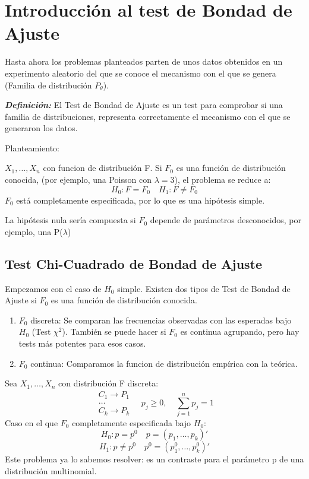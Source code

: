 \section{Introducción al test de Bondad de Ajuste}

Hasta ahora los problemas planteados parten de unos datos obtenidos
en un experimento aleatorio del que se conoce el mecanismo con el que se genera (Familia de distribución $P_\theta$).

\textit{\textbf{Definición: }}El Test de Bondad de Ajuste es un test para comprobar si una familia de distribuciones,
 representa correctamente el mecanismo con el que se generaron los datos.

Planteamiento:

$X_1,\dots,X_n$ con funcion de distribución F. Si $F_0$ es una función de distribución conocida, (por ejemplo, una Poisson con $\lambda=3$), el problema se reduce a:
\[
    H_0: F=F_0 \quad H_1: F \neq F_0
\]
$F_0$ está completamente especificada, por lo que es una hipótesis simple.

La hipótesis nula sería compuesta si $F_0$ depende de parámetros desconocidos, por ejemplo, una P($\lambda$)

\subsection{Test Chi-Cuadrado de Bondad de Ajuste} 

Empezamos con el caso de $H_0$ simple. Existen dos tipos de Test de Bondad de Ajuste si $F_0$ es una función de  distribución conocida.
\begin{enumerate}
    \item $F_0$ discreta: Se comparan las frecuencias observadas con las esperadas bajo $H_0$ (Test $\chi^2$). También se puede hacer si $F_0$ es continua agrupando, pero hay tests más potentes para esos casos.
    \item $F_0$ continua: Comparamos la funcion de distribución empírica con la teórica.
\end{enumerate}

Sea $X_1,\dots,X_n$ con distribución F discreta:
\[
    \begin{matrix}
        C_1 \to P_1\\
        \dots \\
        C_k \to P_k
    \end{matrix}
    \quad
    p_j \geq 0,
    \quad \sum_{j=1}^{n} p_j=1
\]
Caso en el que $F_0$ completamente especificada bajo $H_0$:
\[
    H_0: p=p^0 \quad p=(p_1,\dots,p_k)'
\]
\[
    H_1: p \neq p^0 \quad p^0=(p_1^0,\dots,p_k^0)'
\]
Este problema ya lo sabemos resolver: es un contraste para el parámetro p de una distribución multinomial.

